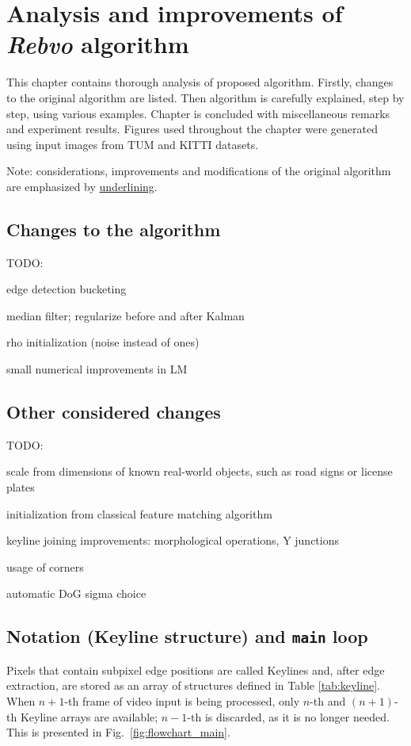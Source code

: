 \chapter{Analysis and improvements of \textit{Rebvo} algorithm}
\label{cha:intro2}

This chapter contains thorough analysis of proposed algorithm. Firstly, changes to the original algorithm are listed. Then algorithm is carefully explained, step by step, using various examples. Chapter is concluded with miscellaneous remarks and experiment results. Figures used throughout the chapter were generated using input images from TUM \cite{tum} and KITTI \cite{kitti} datasets.

Note: considerations, improvements and modifications of the original algorithm are emphasized by \underline{underlining}.

\section{Changes to the algorithm}
\label{sec:changes}

TODO:

edge detection bucketing

median filter; regularize before and after Kalman

rho initialization (noise instead of ones)

small numerical improvements in LM


\section{Other considered changes}
\label{sec:rejected}

TODO:

scale from dimensions of known real-world objects, such as road signs or license plates

initialization from classical feature matching algorithm

keyline joining improvements: morphological operations, Y junctions

usage of corners

automatic DoG sigma choice


\section{Notation (Keyline structure) and {\tt main} loop}

Pixels that contain subpixel edge positions are called Keylines and, after edge extraction, are stored as an array of structures defined in Table \ref{tab:keyline}. When $n+1$-th frame of video input is being processed, only $n$-th and $(n+1)$-th Keyline arrays are available; $n-1$-th is discarded, as it is no longer needed. This is presented in Fig.~\ref{fig:flowchart_main}.

